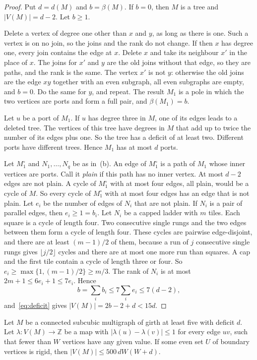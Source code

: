 \documentclass[11pt]{article}
\begin{document}
\begin{proof}
Put $d=d(M)$ and $b=\beta(M)$. If $b=0$, then $M$ is a tree and $|V(M)|=d-2$. Let $b\ge1$.

 Delete a vertex of degree one other than $x$ and $y$, as long as there is one.
Such a vertex is on no join, so the joins and the rank do not change. If then $x$ has degree
one, every join contains the edge at $x$. Delete $x$ and take its neighbour $x'$ in the place of
$x$. The joins for $x'$ and $y$ are the old joins without that edge, so they are paths, and the
rank is the same. The vertex $x'$ is not $y$: otherwise the old joins are the edge $xy$ together
with an even subgraph, all even subgraphs are empty, and $b=0$. Do the same for $y$, and
repeat. The result $M_1$ is a pole in which the two vertices are ports and form a full pair, and
$\beta(M_1)=b$.

 Let $u$ be a port of $M_1$. If $u$ has degree three in $M$, one of its edges
leads to a deleted tree. The vertices of this tree have degrees in $M$ that add up to twice the
number of its edges plus one. So the tree has a deficit of at least two. Different ports have
different trees. Hence $M_1$ has at most $d$ ports.

 Let $M_1^{\circ}$ and $N_1,\dots,N_q$ be as in~(b). An edge of
$M_1^{\circ}$ is a path of $M_1$ whose inner vertices are ports. Call it \emph{plain} if this
path has no inner vertex. At most $d-2$ edges are not plain. A cycle of $M_1^{\circ}$ with at
most four edges, all plain, would be a cycle of $M$. So every cycle of $M_1^{\circ}$ with at
most four edges has an edge that is not plain. Let $e_i$ be the number of edges of $N_i$ that
are not plain. If $N_i$ is a pair of parallel edges, then $e_i\ge1=b_i$. Let $N_i$ be a capped
ladder with $m$ tiles. Each square is a cycle of length four. Two consecutive single rungs and
the two edges between them form a cycle of length four. These cycles are pairwise
edge-disjoint, and there are at least $(m-1)/2$ of them, because a run of $j$ consecutive single
rungs gives $\lfloor j/2\rfloor$ cycles and there are at most one more run than squares. A cap
and the first tile contain a cycle of length three or four. So $e_i\ge\max\{1,(m-1)/2\}\ge m/3$.
The rank of $N_i$ is at most $2m+1\le6e_i+1\le7e_i$. Hence
\[
  b=\sum_ib_i\le7\sum_ie_i\le7(d-2),
\]
and~\eqref{eq:deficit} gives $|V(M)|=2b-2+d<15d$.
\end{proof}

\begin{lemma}\label{lem:rigidpiece}
Let $M$ be a connected subcubic multigraph of girth at least five with deficit $d$. Let
$\lambda\colon V(M)\to\mathbb Z$ be a map with $|\lambda(u)-\lambda(v)|\le1$ for every edge $uv$,
such that fewer than $W$ vertices have any given value. If some even set $U$ of boundary vertices
is rigid, then $|V(M)|\le500\,dW(W+d)$.
\end{lemma}
\end{document}
